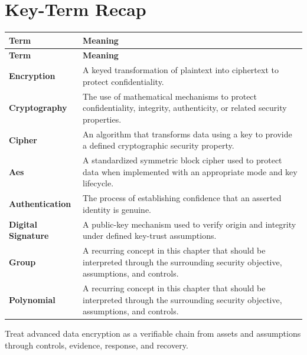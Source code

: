 \documentclass[11pt]{article}
\begin{document}
\section*{Key-Term Recap}
\begin{longtable}{>{\RaggedRight\arraybackslash}p{}>{\RaggedRight\arraybackslash}p{}}
\toprule\rowcolor{Navy}\color{white}\textbf{Term} & \color{white}\textbf{Meaning}\\\midrule
\endfirsthead
\toprule\rowcolor{Navy}\color{white}\textbf{Term} & \color{white}\textbf{Meaning}\\\midrule
\endhead
\textbf{Encryption} & A keyed transformation of plaintext into ciphertext to protect confidentiality. \\\midrule
\textbf{Cryptography} & The use of mathematical mechanisms to protect confidentiality, integrity, authenticity, or related security properties. \\\midrule
\textbf{Cipher} & An algorithm that transforms data using a key to provide a defined cryptographic security property. \\\midrule
\textbf{Aes} & A standardized symmetric block cipher used to protect data when implemented with an appropriate mode and key lifecycle. \\\midrule
\textbf{Authentication} & The process of establishing confidence that an asserted identity is genuine. \\\midrule
\textbf{Digital Signature} & A public-key mechanism used to verify origin and integrity under defined key-trust assumptions. \\\midrule
\textbf{Group} & A recurring concept in this chapter that should be interpreted through the surrounding security objective, assumptions, and controls. \\\midrule
\textbf{Polynomial} & A recurring concept in this chapter that should be interpreted through the surrounding security objective, assumptions, and controls. \\\midrule
\bottomrule
\end{longtable}
\begin{takeawaybox}
Treat advanced data encryption as a verifiable chain from assets and assumptions through controls, evidence, response, and recovery.
\end{takeawaybox}
\end{document}
